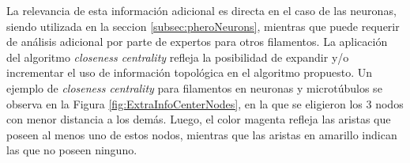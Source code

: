 La relevancia de esta informaci\'on adicional es directa en el caso de las neuronas, siendo utilizada en la seccion \ref{subsec:pheroNeurons}, mientras que puede requerir de an\'alisis adicional por parte de expertos para otros filamentos. La aplicaci\'on del algoritmo {\it closeness centrality} refleja la posibilidad de expandir y/o incrementar el uso de informaci\'on topol\'ogica en el algoritmo propuesto. Un ejemplo de {\it closeness centrality} para filamentos en neuronas y microt\'ubulos se observa en la Figura \ref{fig:ExtraInfoCenterNodes}, en la que se eligieron los 3 nodos con menor distancia a los dem\'as. Luego, el color magenta refleja las aristas que poseen al menos uno de estos nodos, mientras que las aristas en amarillo indican las que no poseen ninguno.

